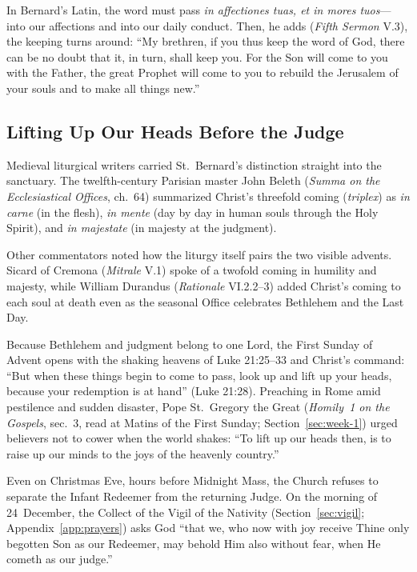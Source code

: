 In Bernard's Latin, the word must pass \textit{in affectiones tuas, et in
mores tuos}---into our affections and into our daily conduct. Then, he adds
(\textit{Fifth Sermon} V.3), the keeping turns around: ``My brethren, if
you thus keep the word of God, there can be no doubt that it, in turn,
shall keep you. For the Son will come to you with the Father, the great
Prophet will come to you to rebuild the Jerusalem of your souls and to make
all things new.''

\subsection{Lifting Up Our Heads Before the Judge}

Medieval liturgical writers carried St.~Bernard's distinction straight into
the sanctuary. The twelfth-century Parisian master John Beleth
(\textit{Summa on the Ecclesiastical Offices}, ch.~64) summarized Christ's
threefold coming (\textit{triplex}) as \textit{in carne} (in the flesh),
\textit{in mente} (day by day in human souls through the Holy Spirit), and
\textit{in majestate} (in majesty at the judgment).

Other commentators noted how the liturgy itself pairs the two visible
advents. Sicard of Cremona (\textit{Mitrale} V.1) spoke of a twofold coming
in humility and majesty, while William Durandus (\textit{Rationale}
VI.2.2--3) added Christ's coming to each soul at death even as the seasonal
Office celebrates Bethlehem and the Last Day.

Because Bethlehem and judgment belong to one Lord, the First Sunday of
Advent opens with the shaking heavens of Luke 21:25--33 and Christ's
command: ``But when these things begin to come to pass, look up and lift up
your heads, because your redemption is at hand'' (Luke 21:28). Preaching in
Rome amid pestilence and sudden disaster, Pope St.~Gregory the Great
(\textit{Homily~1 on the Gospels}, sec.~3, read at Matins of the First
Sunday; Section~\ref{sec:week-1}) urged believers not to cower when the
world shakes: ``To lift up our heads then, is to raise up our minds to the
joys of the heavenly country.''

Even on Christmas Eve, hours before Midnight Mass, the Church refuses to
separate the Infant Redeemer from the returning Judge. On the morning of
24~December, the Collect of the Vigil of the Nativity
(Section~\ref{sec:vigil}; Appendix~\ref{app:prayers}) asks God ``that we,
who now with joy receive Thine only begotten Son as our Redeemer, may
behold Him also without fear, when He cometh as our judge.''

